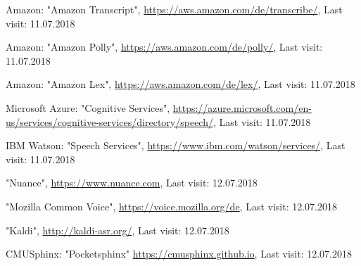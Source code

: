 \documentclass[journal]{IEEEtran}
\begin{document}
\begin{thebibliography}{1}
Amazon: "Amazon Transcript",
\url{https://aws.amazon.com/de/transcribe/},
Last visit: 11.07.2018

Amazon: "Amazon Polly",
\url{https://aws.amazon.com/de/polly/},
Last visit: 11.07.2018

Amazon: "Amazon Lex",
\url{https://aws.amazon.com/de/lex/},
Last visit: 11.07.2018

Microsoft Azure: "Cognitive Services",
\url{https://azure.microsoft.com/en-us/services/cognitive-services/directory/speech/},
Last visit: 11.07.2018

IBM Watson: "Speech Services",
\url{https://www.ibm.com/watson/services/},
Last visit: 11.07.2018

"Nuance",
\url{https://www.nuance.com},
Last visit: 12.07.2018

"Mozilla Common Voice",
\url{https://voice.mozilla.org/de},
Last visit: 12.07.2018

"Kaldi",
\url{http://kaldi-asr.org/},
Last visit: 12.07.2018

CMUSphinx: "Pocketsphinx"
\url{https://cmusphinx.github.io},
Last visit: 12.07.2018
\end{thebibliography}
\end{document}
